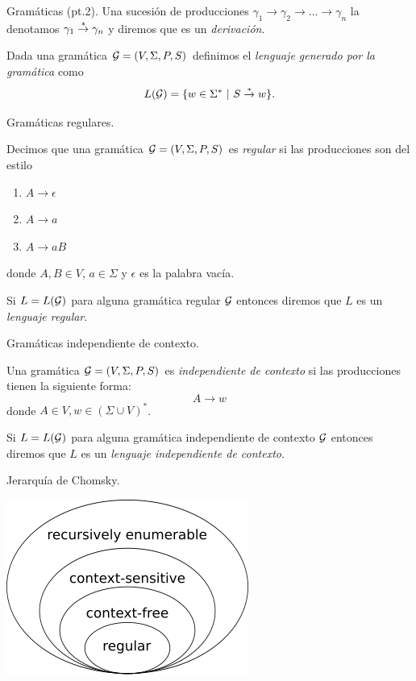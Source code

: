 \documentclass[aspectratio=169, 11pt]{beamer}
\begin{document}
	\begin{frame}[fragile]{Gramáticas (pt.2).}
		Una sucesión de producciones $\gamma_{1} \to \gamma_{2} \to \dots \to \gamma_{n}$ la denotamos $\gamma_{1} \overset{*}{\to} \gamma_{n}$ y diremos que es un \emph{derivación}.



		\begin{deff}
			Dada una gramática ${\cal G} = (V, \Sigma, P, S)$  definimos el \emph{lenguaje generado por la gramática} como
			\[
			L({\cal G}) = \{ w \in \Sigma^* \ | \ S \overset{*}{\to} w   \}.
			\]
		\end{deff}		
	\end{frame}

	\begin{frame}{Gramáticas regulares.}
		\begin{deff}
			Decimos que una gramática ${\cal G} = (V, \Sigma, P, S)$ es \emph{regular} si las producciones son del estilo
	\begin{enumerate}
		\item $A \to \epsilon$
		\item $A \to a$
		\item $A \to a B$
	\end{enumerate}
	donde $A, B \in V$, $a \in \Sigma$ y $\epsilon$ es la palabra vacía. 

	Si $L=L({\cal G})$ para alguna gramática regular $\cal G$ entonces diremos que $L$ es un \emph{lenguaje regular}.
		\end{deff}
	\end{frame}

	\begin{frame}{Gramáticas independiente de contexto.}
		\begin{deff}
			Una gramática ${\cal G} = (V, \Sigma, P, S) $ es \emph{independiente de contexto} si las producciones tienen la siguiente forma:
			\begin{equation*}
				A \to w
			\end{equation*}
			donde $A \in V, w \in (\Sigma \cup V)^*$.  
			
			Si $L=L({\cal G})$ para alguna gramática independiente de contexto $\cal G$ entonces diremos que $L$ es un \emph{lenguaje independiente de contexto}.

		\end{deff}
		
	\end{frame}

	\begin{frame}{Jerarquía de Chomsky.}

			\centering
			\includegraphics[scale = 0.65]{Chomsky-hierarchy.png}
		
	\end{frame}
\end{document}
